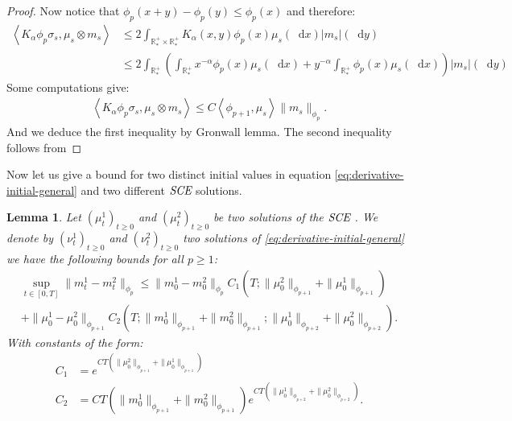 \documentclass[11pt,a4paper]{article}
\newcommand{\RRP}{\mathbb{R}^+_*}
\newcommand{\SCE}{\emph{SCE}}
\newcommand{\Proc}[1]{\left(#1\right)_{t\geq 0}}
\newcommand{\brac}[1]{\left\langle#1\right\rangle}
\newcommand{\dd}{\mathop{}\!\mathrm{d}}
\newtheorem{lemma}[theorem]{Lemma}
\begin{document}
\begin{proof}
    Now notice that $\phi_p(x+y) - \phi_p(y) \leq \phi_p(x)$ and therefore:
    \begin{align*}
        \brac{K_\alpha \phi_p\sigma_s, \mu_s\otimes m_s} 
        &\leq 2\int_{\RRP\times\RRP} K_\alpha(x,y) \phi_p(x)\mu_s(\dd x)|m_s|(\dd y)\\
        &\leq 2\int_{\RRP} \left(\int_{\RRP}x^{-\alpha}\phi_p(x)\mu_s(\dd x) + y^{-\alpha} \int_{\RRP}\phi_p(x)\mu_s(\dd x)\right) |m_s|(\dd y)
    \end{align*}
    Some computations give:
    \begin{align*}
        \brac{K_\alpha \phi_p\sigma_s, \mu_s\otimes m_s}  \leq C\brac{\phi_{p+1},\mu_s} \| m_s\|_{\phi_p}.
    \end{align*}
    And we deduce the first inequality by Gronwall lemma. The second inequality follows from 
\end{proof}
Now let us give a bound for two distinct initial values in equation \eqref{eq:derivative-initial-general} and two different $\SCE$ solutions.
\begin{lemma}\label{lem:pseudo-lip-derivative-eq}
     Let $\Proc{\mu^1_t}$ and $\Proc{\mu^2_t}$ be two solutions of the $\SCE$ . We denote by $\Proc{\nu^1_t}$ and $\Proc{\nu^2_t}$ two solutions of \eqref{eq:derivative-initial-general} we have the following bounds for all $p \geq 1$:
    \begin{multline*}
        \sup\limits_{t \in [0,T]} \| m^1_t - m^2_t \|_{\phi_p} \leq \|m_0^1- m_0^2 \|_{\phi_{p}} C_1\left(T;\| \mu^2_0\|_{\phi_{p+1}} + \| \mu^1_0\|_{\phi_{p+1}}\right)\\
        + \|\mu_0^1- \mu_0^2 \|_{\phi_{p+1}}C_2\left(T; \|m^1_0\|_{\phi_{p+1}}+ \|m^2_0\|_{\phi_{p+1}};\|\mu^1_0\|_{\phi_{p +2}} + \|\mu^2_0\|_{\phi_{p +2}}\right).
    \end{multline*}
    With constants of the form:
    \begin{align*}
        C_1 &= e^{CT\left(\| \mu^2_0\|_{\phi_{p+1}} + \| \mu^1_0\|_{\phi_{p+1}}\right)}\\
        C_2 &= CT(\|m^1_0\|_{\phi_{p+1}}+ \|m^2_0\|_{\phi_{p+1}})e^{CT\left(\|\mu^1_0\|_{\phi_{p +2}} + \|\mu^2_0\|_{\phi_{p +2}}\right)}.
    \end{align*}
\end{lemma}
\end{document}
